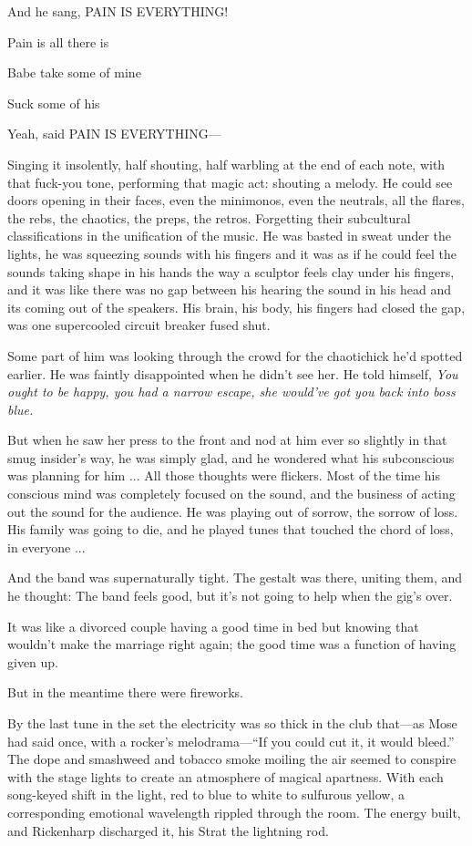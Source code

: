 And he sang, PAIN IS EVERYTHING!

Pain is all there is

Babe take some of mine

Suck some of his

Yeah, said PAIN IS EVERYTHING---

Singing it insolently, half shouting, half warbling at the end of each note, with that fuck-you tone, performing that magic act: shouting a melody. He could see doors opening in their faces, even the minimonos, even the neutrals, all the flares, the rebs, the chaotics, the preps, the retros. Forgetting their subcultural classifications in the unification of the music. He was basted in sweat under the lights, he was squeezing sounds with his fingers and it was as if he could feel the sounds taking shape in his hands the way a sculptor feels clay under his fingers, and it was like there was no gap between his hearing the sound in his head and its coming out of the speakers. His brain, his body, his fingers had closed the gap, was one supercooled circuit breaker fused shut.

Some part of him was looking through the crowd for the chaotichick he'd spotted earlier. He was faintly disappointed when he didn't see her. He told himself, \textit{You ought to be happy, you had a narrow escape, she would've got you back into boss blue.}

But when he saw her press to the front and nod at him ever so slightly in that smug insider's way, he was simply glad, and he wondered what his subconscious was planning for him ... All those thoughts were flickers. Most of the time his conscious mind was completely focused on the sound, and the business of acting out the sound for the audience. He was playing out of sorrow, the sorrow of loss. His family was going to die, and he played tunes that touched the chord of loss, in everyone ...

And the band was supernaturally tight. The gestalt was there, uniting them, and he thought: The band feels good, but it's not going to help when the gig's over.

It was like a divorced couple having a good time in bed but knowing that wouldn't make the marriage right again; the good time was a function of having given up.

But in the meantime there were fireworks.

By the last tune in the set the electricity was so thick in the club that---as Mose had said once, with a rocker's melodrama---``If you could cut it, it would bleed.'' The dope and smashweed and tobacco smoke moiling the air seemed to conspire with the stage lights to create an atmosphere of magical apartness. With each song-keyed shift in the light, red to blue to white to sulfurous yellow, a corresponding emotional wavelength rippled through the room. The energy built, and Rickenharp discharged it, his Strat the lightning rod.

